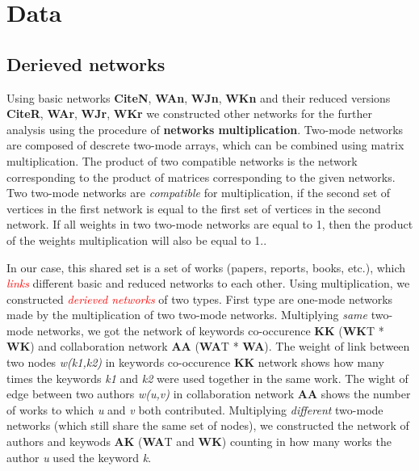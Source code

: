 \documentclass[11pt]{article} %
\newcommand{\keyw}[1]{\textcolor{red}{\emph{#1}}}
\begin{document}

\section{Data}

\subsection{Derieved networks}

Using basic networks \textbf{CiteN}, \textbf{WAn}, \textbf{WJn}, \textbf{WKn} and their reduced versions \textbf{CiteR}, \textbf{WAr}, \textbf{WJr}, \textbf{WKr} we constructed other networks for the further analysis using the procedure of \textbf{networks multiplication}. Two-mode networks are composed of descrete two-mode arrays, which can be combined using matrix multiplication. The product of two compatible networks is the network corresponding to the product of matrices corresponding to the given networks. Two two-mode networks are \textit{compatible} for multiplication, if the second set of vertices in the first network is equal to the first set of vertices in the second network. If all weights in two two-mode networks are equal to 1, then the product of the weights multiplication will also be equal to 1.\citep{OnBibl,Understand}. \medskip 

In our case, this shared set is a set of works (papers, reports, books, etc.), which \keyw{links} different basic and reduced networks to each other. Using multiplication, we constructed \keyw{derieved networks} of two types. First type are one-mode networks made by the multiplication of two two-mode networks. Multiplying \textit{same} two-mode networks, we got the network of keywords co-occurence \textbf{KK} (\textbf{WK}T * \textbf{WK}) and collaboration network \textbf{AA} (\textbf{WA}T * \textbf{WA}). The weight of link between two nodes \textit{w(k1,k2)} in keywords co-occurence \textbf{KK} network shows how many times the keywords \textit{k1} and \textit{k2} were used together in the same work. The wight of edge between two authors \textit{w(u,v)} in collaboration network \textbf{AA} shows the number of works to which \textit{u} and \textit{v} both contributed. Multiplying \textit{different} two-mode networks (which still share the same set of nodes), we constructed the network of authors and keywods \textbf{AK} (\textbf{WA}T and \textbf{WK}) counting in how many works the author \textit{u} used the keyword \textit{k}. \medskip 
\end{document}
